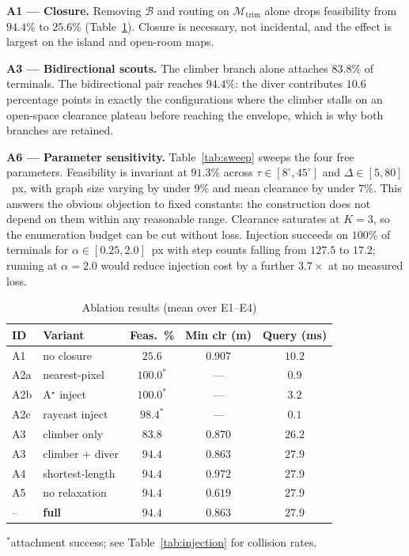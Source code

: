 \documentclass[conference]{IEEEtran}
\begin{document}
\textbf{A1 --- Closure.} Removing $\mathcal{B}$ and routing on $\mathcal{M}_{\mathrm{trim}}$ alone drops feasibility from $94.4\%$ to $25.6\%$ (Table~\ref{tab:ablation}). Closure is necessary, not incidental, and the effect is largest on the island and open-room maps.

\textbf{A3 --- Bidirectional scouts.} The climber branch alone attaches $83.8\%$ of terminals. The bidirectional pair reaches $94.4\%$: the diver contributes $10.6$ percentage points in exactly the configurations where the climber stalls on an open-space clearance plateau before reaching the envelope, which is why both branches are retained.

\textbf{A6 --- Parameter sensitivity.} Table~\ref{tab:sweep} sweeps the four free parameters. Feasibility is invariant at $91.3\%$ across $\tau\in[8^\circ,45^\circ]$ and $\Delta\in[5,80]$~px, with graph size varying by under $9\%$ and mean clearance by under $7\%$. This answers the obvious objection to fixed constants: the construction does not depend on them within any reasonable range. Clearance saturates at $K=3$, so the enumeration budget can be cut without loss. Injection succeeds on $100\%$ of terminals for $\alpha\in[0.25,2.0]$~px with step counts falling from $127.5$ to $17.2$; running at $\alpha=2.0$ would reduce injection cost by a further $3.7\times$ at no measured loss.

\begin{table}[htbp]
\caption{Ablation results (mean over E1--E4)}
\label{tab:ablation}
\begin{center}
\begin{tabular}{@{}llccc@{}}
\toprule
\textbf{ID} & \textbf{Variant} & \textbf{Feas.\ \%} & \textbf{Min clr (m)} & \textbf{Query (ms)} \\ \midrule
A1 & no closure & $25.6$ & $0.907$ & $10.2$ \\
A2a & nearest-pixel & $100.0^{\ast}$ & --- & $0.9$ \\
A2b & A$^\star$ inject & $100.0^{\ast}$ & --- & $3.2$ \\
A2c & raycast inject & $98.4^{\ast}$ & --- & $0.1$ \\
A3 & climber only & $83.8$ & $0.870$ & $26.2$ \\
A3 & climber + diver & $\mathbf{94.4}$ & $0.863$ & $27.9$ \\
A4 & shortest-length & $94.4$ & $0.972$ & $27.9$ \\
A5 & no relaxation & $94.4$ & $0.619$ & $27.9$ \\
-- & \textbf{full} & $\mathbf{94.4}$ & $0.863$ & $27.9$ \\ \bottomrule
\end{tabular}
\end{center}
\footnotesize $^{\ast}$attachment success; see Table~\ref{tab:injection} for collision rates.
\end{table}
\end{document}
